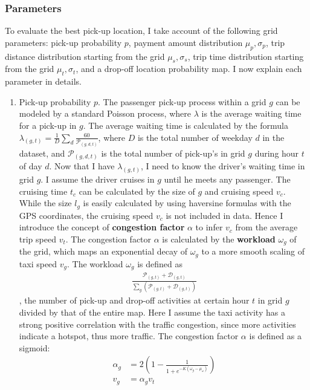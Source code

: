 \documentclass[letterpaper, 10 pt, conference]{ieeeconf}
\begin{document}
\subsubsection{Parameters}
To evaluate the best pick-up location, I take account of the following grid parameters: pick-up probability $p$, payment amount distribution $\mu_p, \sigma_p$, trip distance distribution starting from the grid $\mu_s, \sigma_s$, trip time distribution starting from the grid $\mu_t, \sigma_t$, and a drop-off location probability map. I now explain each parameter in details.
\begin{enumerate}
\item Pick-up probability $p$. The passenger pick-up process within a grid $g$ can be modeled by a standard Poisson process, where $\lambda$ is the average waiting time for a pick-up in $g$. The average waiting time is calculated by the formula $\lambda_{(g,t)} = \frac{1}{D}\sum_d\frac{60}{\mathcal{P}_{(g,d,t)}}$, where $D$ is the total number of weekday $d$ in the dataset, and $\mathcal{P}_{(g,d,t)}$ is the total number of pick-up's in grid $g$ during hour $t$ of day $d$. Now that I have $\lambda_{(g,t)}$, I need to know the driver's waiting time in grid $g$. I assume the driver cruises in $g$ until he meets any passenger. The cruising time $t_c$ can be calculated by the size of $g$ and cruising speed $v_c$. While the size $l_g$ is easily calculated by using haversine formulas with the GPS coordinates, the cruising speed $v_c$ is not included in data. Hence I introduce the concept of \textbf{congestion factor} $\alpha$ to infer $v_c$ from the average trip speed $v_t$. The congestion factor $\alpha$ is calculated by the \textbf{workload} $\omega_g$ of the grid, which maps an exponential decay of $\omega_g$ to a more smooth scaling of taxi speed $v_g$. The workload $\omega_g$ is defined as
\begin{align}
\frac{\mathcal{P}_{(g,t)}+\mathcal{D}_{(g,t)}}{\sum_{g}(\mathcal{P}_{(g,t)}+\mathcal{D}_{(g,t)})}
\end{align}, the number of pick-up and drop-off activities at certain hour $t$ in grid $g$ divided by that of the entire map. Here I assume the taxi activity has a strong positive correlation with the traffic congestion, since more activities indicate a hotspot, thus more traffic. The congestion factor $\alpha$ is defined as a sigmoid:
\begin{align}
\alpha_g &= 2(1-\frac{1}{1+e^{-K(\omega_g-\mu_\omega)}})\\
v_g &= \alpha_gv_t
\end{align}

\end{enumerate}
\end{document}
